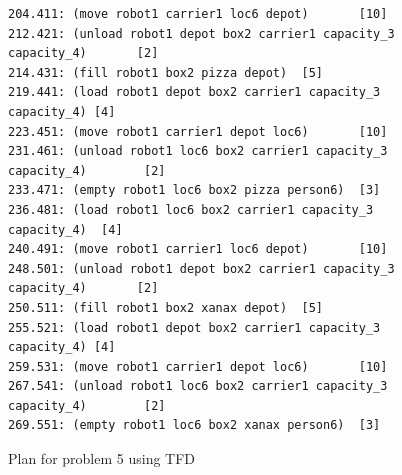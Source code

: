 \begin{figure}[h!]
\begin{verbatim}
204.411: (move robot1 carrier1 loc6 depot)       [10]
212.421: (unload robot1 depot box2 carrier1 capacity_3 capacity_4)       [2]
214.431: (fill robot1 box2 pizza depot)  [5]
219.441: (load robot1 depot box2 carrier1 capacity_3 capacity_4) [4]
223.451: (move robot1 carrier1 depot loc6)       [10]
231.461: (unload robot1 loc6 box2 carrier1 capacity_3 capacity_4)        [2]
233.471: (empty robot1 loc6 box2 pizza person6)  [3]
236.481: (load robot1 loc6 box2 carrier1 capacity_3 capacity_4)  [4]
240.491: (move robot1 carrier1 loc6 depot)       [10]
248.501: (unload robot1 depot box2 carrier1 capacity_3 capacity_4)       [2]
250.511: (fill robot1 box2 xanax depot)  [5]
255.521: (load robot1 depot box2 carrier1 capacity_3 capacity_4) [4]
259.531: (move robot1 carrier1 depot loc6)       [10]
267.541: (unload robot1 loc6 box2 carrier1 capacity_3 capacity_4)        [2]
269.551: (empty robot1 loc6 box2 xanax person6)  [3]
    \end{verbatim}
    \caption{Plan for problem 5 using TFD}
    \label{problem5_plan_tfd}
\end{figure}
